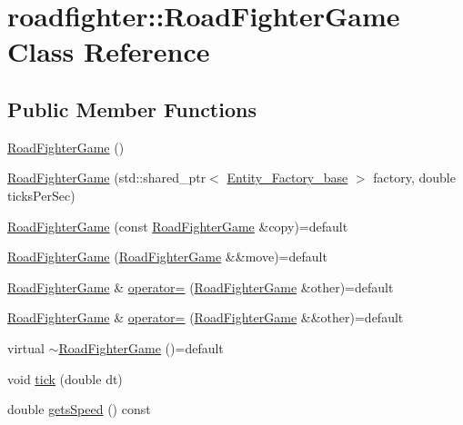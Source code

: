 \hypertarget{classroadfighter_1_1RoadFighterGame}{}\section{roadfighter\+:\+:Road\+Fighter\+Game Class Reference}
\label{classroadfighter_1_1RoadFighterGame}
\subsection*{Public Member Functions}
\begin{DoxyCompactItemize}
\item 
\hyperlink{classroadfighter_1_1RoadFighterGame_a53d3c84fb27feef4e698e5d0e9f0a59a}{Road\+Fighter\+Game} ()
\item 
\hyperlink{classroadfighter_1_1RoadFighterGame_a62e5d9d595ca8ec77f0f2d0078a7078f}{Road\+Fighter\+Game} (std\+::shared\+\_\+ptr$<$ \hyperlink{classroadfighter_1_1Entity__Factory__base}{Entity\+\_\+\+Factory\+\_\+base} $>$ factory, double ticks\+Per\+Sec)
\item 
\hyperlink{classroadfighter_1_1RoadFighterGame_a972a332abf53705ac2e6b11cf4c446aa}{Road\+Fighter\+Game} (const \hyperlink{classroadfighter_1_1RoadFighterGame}{Road\+Fighter\+Game} \&copy)=default
\item 
\hyperlink{classroadfighter_1_1RoadFighterGame_ad5801b8550efd5b3c8b2029b5b11bd34}{Road\+Fighter\+Game} (\hyperlink{classroadfighter_1_1RoadFighterGame}{Road\+Fighter\+Game} \&\&move)=default
\item 
\hyperlink{classroadfighter_1_1RoadFighterGame}{Road\+Fighter\+Game} \& \hyperlink{classroadfighter_1_1RoadFighterGame_a2bfbab81a2304aa6c1e27571720ec431}{operator=} (\hyperlink{classroadfighter_1_1RoadFighterGame}{Road\+Fighter\+Game} \&other)=default
\item 
\hyperlink{classroadfighter_1_1RoadFighterGame}{Road\+Fighter\+Game} \& \hyperlink{classroadfighter_1_1RoadFighterGame_a8887e487ce6d91da4c380eee1d3d7051}{operator=} (\hyperlink{classroadfighter_1_1RoadFighterGame}{Road\+Fighter\+Game} \&\&other)=default
\item 
virtual \hyperlink{classroadfighter_1_1RoadFighterGame_ab7e8842d97c76acc3898eaab6ebacb69}{$\sim$\+Road\+Fighter\+Game} ()=default
\item 
void \hyperlink{classroadfighter_1_1RoadFighterGame_a1bbb706a128d1f98e06ea5e0f6ab1581}{tick} (double dt)
\item 
double \hyperlink{classroadfighter_1_1RoadFighterGame_afd3d3d025119a6f730667b4924a3a42a}{gets\+Speed} () const

\end{DoxyCompactItemize}
